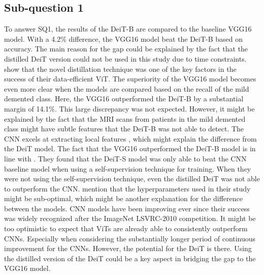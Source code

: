 \documentclass[11pt, a4paper]{article}
\begin{document}
\subsection{Sub-question 1} \label{subs:sq1}
To answer SQ1, the results of the DeiT-B are compared to the baseline VGG16 model. With a 4.2\% difference, the VGG16 model beat the DeiT-B based on accuracy. The main reason for the gap could be explained by the fact that the distilled DeiT version could not be used in this study due to time constraints. \cite{Touvron2021TrainingAttention} show that the novel distillation technique was one of the key factors in the success of their data-efficient ViT. The superiority of the VGG16 model becomes even more clear when the models are compared based on the recall of the mild demented class. Here, the VGG16 outperformed the DeiT-B by a substantial margin of 14.1\%. This large discrepancy was not expected. However, it might be explained by the fact that the MRI scans from patients in the mild demented class might have subtle features that the DeiT-B was not able to detect. The CNN excels at extracting local features \citep{Ebrahimighahnavieh2020DeepReview}, which might explain the difference from the DeiT model. The fact that the VGG16 outperformed the DeiT-B model is in line with \cite{Yin2022SMIL-DeiT:MultipleClassification}. They found that the DeiT-S model was only able to beat the CNN baseline model when using a self-supervision technique for training. When they were not using the self-supervision technique, even the distilled DeiT was not able to outperform the CNN. \cite{Touvron2021TrainingAttention} mention that the hyperparameters used in their study might be sub-optimal, which might be another explanation for the difference between the models. CNN models have been improving ever since their success was widely recognized after the ImageNet LSVRC-2010 competition. It might be too optimistic to expect that ViTs are already able to consistently outperform CNNs. Especially when considering the substantially longer period of continuous improvement for the CNNs. However, the potential for the DeiT is there. Using the distilled version of the DeiT could be a key aspect in bridging the gap to the VGG16 model. 
\end{document}
